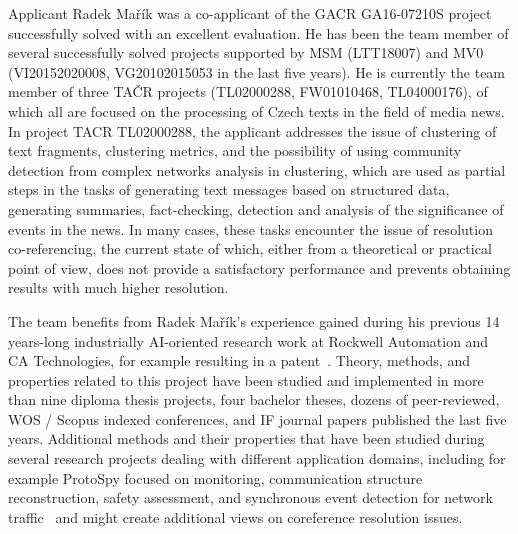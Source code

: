 Applicant Radek Mařík was a co-applicant of the GACR GA16-07210S project successfully solved with an excellent evaluation. He has been the team member of several successfully solved projects supported by MSM (LTT18007) and MV0 (VI20152020008, VG20102015053 in the last five years). He is currently the team member of three TAČR projects (TL02000288, FW01010468, TL04000176), of which all are focused on the processing of Czech texts in the field of media news. In project TACR TL02000288, the applicant addresses the issue of clustering of text fragments, clustering metrics, and the possibility of using community detection from complex networks analysis in clustering, which are used as partial steps in the tasks of generating text messages based on structured data, generating summaries, fact-checking, detection and analysis of the significance of events in the news. In many cases, these tasks encounter the issue of resolution co-referencing, the current state of which, either from a theoretical or practical point of view, does not provide a satisfactory performance and prevents obtaining results with much higher resolution.

The team benefits from Radek Mařík's experience gained during his previous 14 years-long industrially AI-oriented research work at Rockwell Automation and CA Technologies, for example resulting in a patent~\cite{Marik2011}. Theory, methods, and properties related to this project have been studied and implemented in more than nine diploma thesis projects, four bachelor theses, dozens of peer-reviewed, WOS / Scopus indexed conferences, and IF journal papers published the last five years. Additional methods and their properties that have been studied during several research projects dealing with different application domains, including for example ProtoSpy focused on monitoring, communication structure reconstruction, safety assessment, and synchronous event detection for network traffic~\cite{Marik2015b,Marik2014a} and might create additional views on coreference resolution issues.


